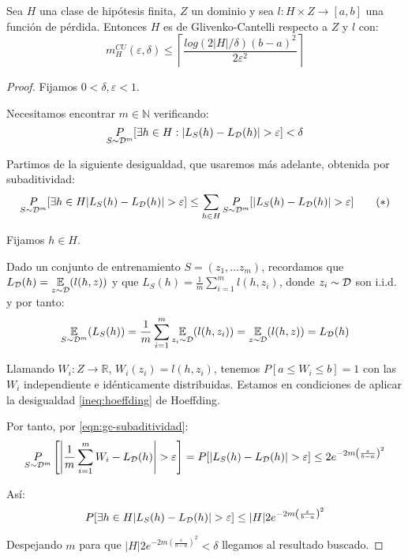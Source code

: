   
\begin{fact}
Sea $H$ una clase de hipótesis finita, $Z$ un dominio y sea $l : H \times Z \rightarrow [a,b]$ una función de pérdida.
Entonces $H$ es de Glivenko-Cantelli respecto a $Z$ y $l$ con:
\[
  m_{H}^{CU}(\varepsilon, \delta) \le \left\lceil \frac{log(2|H|/\delta)(b-a)^2}{2\varepsilon^2} \right\rceil
\]
\label{fact:finitas-gc}
\end{fact}
  \begin{proof}
  Fijamos $0 < \delta, \varepsilon < 1$. 
  
  Necesitamos encontrar $m\in \mathbb{N}$ verificando:
  \[
    \underset{S\sim \mathcal{D}^m}{P} [\exists h\in H : |L_S(h) - L_{\mathcal{D}}(h)| > \varepsilon] < \delta
  \]

  Partimos de la siguiente desigualdad, que usaremos más adelante, obtenida por subaditividad:
  \begin{equation}
  \underset{S\sim \mathcal{D}^m}{P} [\exists h\in H |L_S(h) - L_{\mathcal{D}}(h)| > \varepsilon] \le 
  \sum_{h \in H} \underset{S\sim \mathcal{D}^m}{P} [|L_S(h) - L_{\mathcal{D}}(h)| > \varepsilon]
  \label{eqn:gc-subaditividad}\tag{$\ast$}
  \end{equation}

  Fijamos $h \in H$.

  Dado un conjunto de entrenamiento $S = (z_1, \ldots z_m)$, recordamos que 
  $L_{\mathcal{D}} (h) = \underset{z\sim \mathcal{D}}{\mathbb{E}} (l(h,z))$ y que $L_{S}(h) = \frac{1}{m} \sum_{i=1}^m l(h,z_i)$, donde $z_i \sim \mathcal{D}$ son i.i.d.
  y por tanto:
  \[
    \underset{S\sim \mathcal{D}^m}{\mathbb{E}} (L_S(h)) = \frac{1}{m} \sum_{i=1}^m \underset{z_i\sim \mathcal{D}} {\mathbb{E}}(l(h,z_i)) =  \underset{z\sim \mathcal{D}}{\mathbb{E}} (l(h,z)) = L_{\mathcal{D}} (h)
  \] 
  
  Llamando $W_i:Z \rightarrow \mathbb{R}$, $W_i (z_i) = l(h,z_i)$, tenemos $P[a \le W_i \le b] = 1$
  con las $W_i$ independiente e idénticamente distribuidas. Estamos en condiciones de aplicar la desigualdad \ref{ineq:hoeffding} de Hoeffding.

  Por tanto, por \eqref{eqn:gc-subaditividad}:
  \[
    \underset{S\sim \mathcal{D}^m}{P} \left[\left| \frac{1}{m} \sum_{i=1}^m W_i - L_{\mathcal{D}} (h) \right| > \varepsilon\right] = 
    P [|L_S(h) - L_{\mathcal{D}}(h)| > \varepsilon] \le 2e^{-2m \left( \frac{\varepsilon}{b-a} \right)^2}
  \]

  Así:
  \[
    P [\exists h\in H |L_S(h) - L_{\mathcal{D}}(h)| > \varepsilon] \le 
    |H| 2e^{-2m \left( \frac{\varepsilon}{b-a} \right)^2}
  \]

  Despejando $m$ para que $|H| 2e^{-2m \left( \frac{\varepsilon}{b-a} \right)^2} < \delta$ 
  llegamos al resultado buscado.
  \end{proof}

